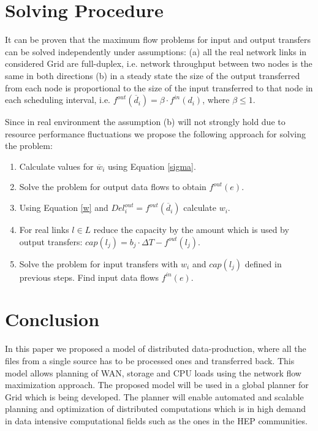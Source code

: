 \section{Solving Procedure}
\label{solve}
It can be proven that the maximum flow problems for input and output transfers can be solved independently under assumptions: (a) all the real network links in considered Grid are full-duplex, i.e. network throughput between two nodes is the same in both directions (b) in a steady state the size of the output transferred from each node is proportional to the size of the input transferred to that node in each scheduling interval, i.e. $f^{out}(\overline{d}_{i})= \beta \cdot f^{in}(d_{i})$, where $\beta \leq 1$.

Since in real environment the assumption (b) will not strongly hold due to resource performance fluctuations we propose the following approach for solving the problem:

\begin{enumerate}
\item Calculate values for $\overline{w}_{i}$ using Equation \ref{sigma}.
\item Solve the problem for output data flows to obtain $f^{out}(e)$.
\item Using Equation \ref{w} and $Del_{i}^{out} = f^{out}(\overline{d}_{i})$ calculate $w_{i}$.
\item For real links $l \in L$ reduce the capacity by the amount which is used by output transfers: $cap(l_{j}) = b_{j} \cdot \Delta T - f^{out}(l_{j})$.
\item Solve the problem for input transfers with $w_{i}$ and $cap(l_{j})$ defined in previous steps. Find input data flows $f^{in}(e)$.
\end{enumerate}

\section{Conclusion}
\label{Conclusion}
In this paper we proposed a model of distributed data-production, where all the files from a single source has to be processed ones and transferred back. This model allows planning of WAN, storage and CPU loads using the network flow maximization approach. The proposed model will be used in a global planner for Grid which is being developed. The planner will enable automated and scalable planning and optimization of distributed computations which is in high demand in data intensive computational fields such as the ones in the HEP communities.

